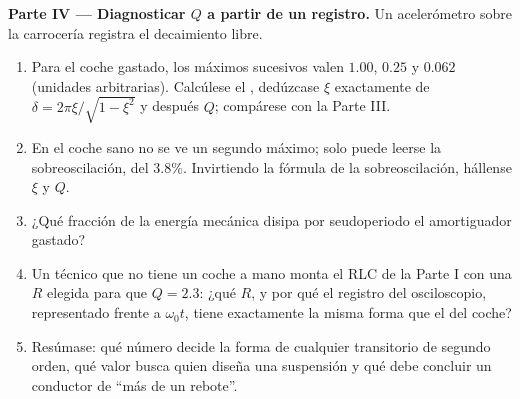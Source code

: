 \begin{problem}
\medskip
\noindent\textbf{Parte IV --- Diagnosticar $Q$ a partir de un registro.}
Un acelerómetro sobre la carrocería registra el decaimiento libre.
\begin{enumerate}[resume]
  \item Para el coche gastado, los máximos sucesivos valen $1.00$, $0.25$
        y $0.062$ (unidades arbitrarias). Calcúlese el , dedúzcase $\xi$ exactamente de
        $\delta = 2\pi\xi/\sqrt{1 - \xi^2}$ y después $Q$; compárese con
        la Parte III.
  \item En el coche sano no se ve un segundo máximo; solo puede leerse la
        sobreoscilación, del $3.8\%$. Invirtiendo la fórmula de la
        sobreoscilación, hállense $\xi$ y $Q$.
  \item ¿Qué fracción de la energía mecánica disipa por seudoperiodo el
        amortiguador gastado?
  \item Un técnico que no tiene un coche a mano monta el RLC de la Parte I
        con una $R$ elegida para que $Q = 2.3$: ¿qué $R$, y por qué el
        registro del osciloscopio, representado frente a $\omega_0 t$,
        tiene exactamente la misma forma que el del coche?
  \item Resúmase: qué número  decide la forma de cualquier
        transitorio de segundo orden, qué valor busca quien diseña una
        suspensión y qué debe concluir un conductor de ``más de un
        rebote''.
\end{enumerate}
\end{problem}
